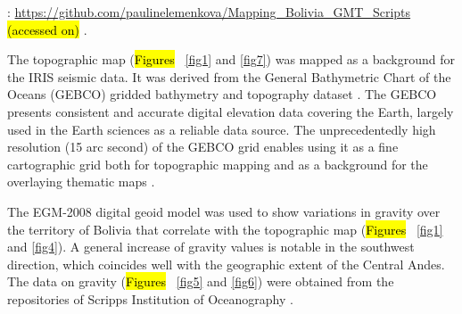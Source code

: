 \documentclass[data,article,accept,pdftex,moreauthors]{Definitions/mdpi}
\begin{document}
: \url{https://github.com/paulinelemenkova/Mapping\_Bolivia\_GMT\_Scripts} \hl{(accessed on)}%
.

The topographic map (\hl{Figures} %
~\ref{fig1} and \ref{fig7}) was mapped as a background {for the} IRIS seismic data. {It was derived} from {the} General Bathymetric Chart of the Oceans (GEBCO) gridded bathymetry and topography dataset \cite{Schenke2016}. {The} GEBCO presents consistent and accurate digital elevation data covering the Earth{,} largely used in {the} Earth sciences {as a} reliable data source. The unprecedentedly high resolution (15 arc second) of {the} GEBCO grid enables using it as a fine cartographic grid both for topographic mapping and as a background for {the} overlaying thematic maps \cite{Lemenkova2020b}{.} 

{The} EGM-2008 \cite{Pavlis} digital geoid model {was used} to show {variations} in gravity over the territory of Bolivia that {correlate} with the topographic map {(}\hl{Figures} %
~\ref{fig1} and \ref{fig4}). {A} general increase of gravity values {is notable} in the southwest direction, which coincides {well} with the {geographic} extent of {the} Central Andes. The data on{ }gravity (\hl{Figures} %
~\ref{fig5} and \ref{fig6}) were obtained {from} the repositories of Scripps Institution of Oceanography \cite{Sandwelletal2014}. 
\end{document}
